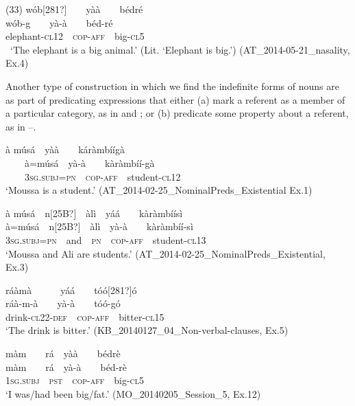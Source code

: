 \documentclass[output=paper]{langsci/langscibook}
\begin{document}
\ea\label{ex:teo:33}
\label{bkm:Ref432715665}\textup{(33) }w\'{o}b[281?]\ \ \ \ y\`{a}\`{a}\ \ \ \ b\'{e}dr\'{e}\\
\gll w\'{o}b-g\ \ \ \ y\`{a}-\`{a}\ \ \ \ b\'{e}d\nobreakdash-r\'{e}\\
elephant\nobreakdash-\textsc{cl12\ \ cop-aff}\ \ big\nobreakdash-\textsc{cl5}\\
\glt \ ‘The elephant is a big animal.’ (Lit. ‘Elephant is big.’) (AT\_2014-05-21\_nasality, Ex.4)
\z

Another type of construction in which we find the indefinite forms of nouns are as part of predicating expressions that either (a) mark a referent as a member of a particular category, as in  and ; or (b) predicate some property about a referent, as in –.

\ea\label{ex:teo:34}
\label{bkm:Ref264214071}à músá\ \ y\`{a}\`{a}\ \ \ \ k\'{a}ràmb\'{i}\'{i}gà\\
\ \ \ \ à=músá\ \ y\`{a}-\`{a}\ \ \ \ kàràmb\'{i}\'{i}\nobreakdash-gà\\
\ \ \ \ \textsc{3sg.subj=pn\ \ cop-aff}\ \ student\nobreakdash-\textsc{cl12}\\
\glt ‘Moussa is a student.’ (AT\_2014-02-25\_NominalPreds\_Existential Ex.1)
\z

\ea\label{ex:teo:35}

\label{bkm:Ref264214078}à músá\ \ n[25B?]\ \ àlì\ \ yá\'{a}\ \ \ \ kàràmb\'{i}\'{i}sì\\
\gll à=músá\ \ n[25B?]\ \ àlì\ \ yà-à\ \ \ \ kàràmb\'{i}\'{i}-sì\\
\textsc{3sg.subj=pn}\ \ and\ \ \textsc{pn\ \  cop-aff}\ \ student\nobreakdash-\textsc{cl13}\\
\glt ‘Moussa and Ali are students.’ (AT\_2014-02-25\_NominalPreds\_Existential, Ex.3)
\z

\ea\label{ex:teo:36}
\label{bkm:Ref264214086}ráàmà\ \ \ \ \ \ y\'{a}\'{a}\ \ \ \ tóó[281?]ó\\
\gll ráà\nobreakdash-m\nobreakdash-à\ \ \ \ yà-\`{a}\ \ \ \ tóó-gó\\
drink\nobreakdash-\textsc{cl22-def\ \ cop-aff}\ \ bitter\nobreakdash-\textsc{cl15}\\
\glt ‘The drink is bitter.’ (KB\_20140127\_04\_Non-verbal-clauses, Ex.5)
\z

\ea\label{ex:teo:37}
\label{bkm:Ref264214132}màm\ \ \ \ rá\ \ yà\`{a}\ \ \ \ bédrè\\
\gll màm\ \ \ \ rá\ \ yà-\`{a}\ \ \ \ béd\nobreakdash-rè\\
\textsc{1sg.subj\ \ pst\ \ }\textsc{cop-aff}\ \ big\nobreakdash-\textsc{cl5}\\
\glt ‘I was/had been big/fat.’ (MO\_20140205\_Session\_5, Ex.12)
\z
\end{document}
